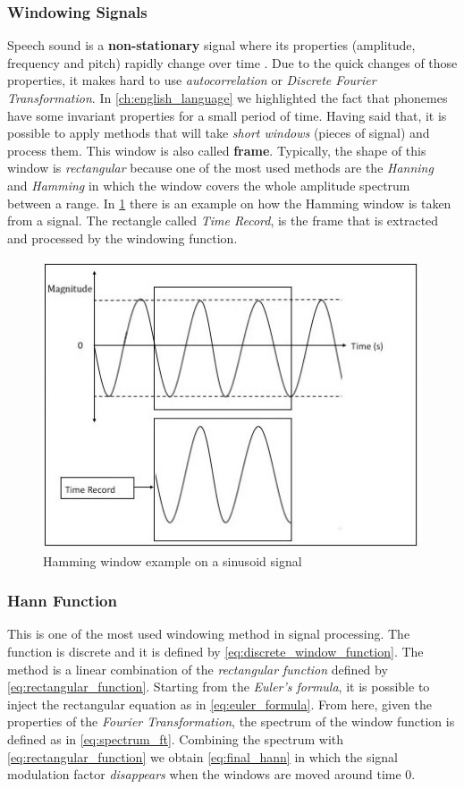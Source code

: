 \subsubsection{Windowing Signals}
\label{ssubs:windowing_signals}
Speech sound is a \textbf{non-stationary} signal where its properties (amplitude, frequency and pitch) rapidly change over time \cite{windowing_fi}. Due to the quick changes of those properties, it makes hard to use \textit{autocorrelation} or \textit{Discrete Fourier Transformation}. In \ref{ch:english_language} we highlighted the fact that phonemes have some invariant properties for a small period of time. Having said that, it is possible to apply methods that will take \textit{short windows} (pieces of signal) and process them. This window is also called \textbf{frame}. Typically, the shape of this window is \textit{rectangular} because one of the most used methods are the \textit{Hanning} and \textit{Hamming} in which the window covers the whole amplitude spectrum between a range. In \ref{fig:windowing_ex} there is an example on how the Hamming window is taken from a signal. The rectangle called \textit{Time Record}, is the frame that is extracted and processed by the windowing function. 

\begin{figure}[!ht]
	\centering
	\includegraphics[scale=0.5]{Figures/windowing.png}
	\caption{Hamming window example on a sinusoid signal}
	\label{fig:windowing_ex}
\end{figure}


\subsubsection{Hann Function}
\label{ssubs:hann_function}
This is one of the most used windowing method in signal processing. The function is discrete and it is defined by \ref{eq:discrete_window_function}. The method is a linear combination of the \textit{rectangular function} defined by \ref{eq:rectangular_function}. Starting from the \textit{Euler's formula}, it is possible to inject the rectangular equation as in \ref{eq:euler_formula}. From here, given the properties of the \textit{Fourier Transformation}, the spectrum of the window function is defined as in \ref{eq:spectrum_ft}. Combining the spectrum with \ref{eq:rectangular_function} we obtain \ref{eq:final_hann} in which the signal modulation factor \textit{disappears} when the windows are moved around time $0$.

